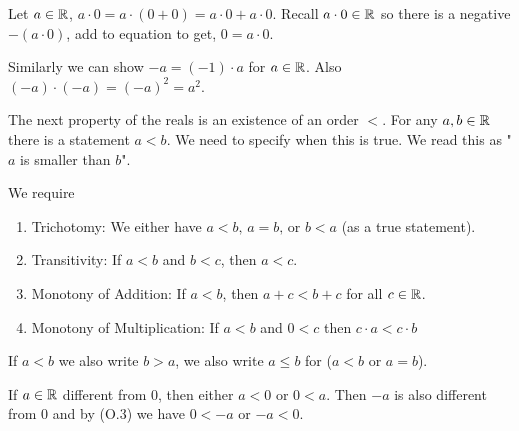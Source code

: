 \documentclass[10pt, a4paper]{article}
\begin{document}
Let $a \in \mathbb{R}$, $a \cdot 0 = a \cdot (0 + 0) = a \cdot 0 + a \cdot 0$. Recall $a \cdot 0 \in \mathbb{R}$ so there is a negative $-(a \cdot 0)$, add to equation to get, $0 = a \cdot 0$.

Similarly we can show $-a = (-1) \cdot a$ for $a \in \mathbb{R}$. Also $(-a) \cdot (-a) = (-a) ^ 2 = a ^ 2$.


The next property of the reals is an existence of an order $<$. For any $a, b \in \mathbb{R}$ there is a statement $a < b$. We need to specify when this is true. We read this as "$a$ is smaller than $b$".

We require
\begin{enumerate}[label = (O.\arabic*)]
    \item Trichotomy\label{analy_axiom_trichotomy}: We either have $a < b,\, a = b,\,\text{or } b < a$ (as a true statement).
    \item Transitivity: If $a < b$ and $b < c$, then $a < c$.
    \item Monotony of Addition: If $a < b$, then $a + c < b + c$ for all $c \in \mathbb{R}$.
    \item Monotony of Multiplication: If $a < b$ and $0 < c$ then $c \cdot a < c \cdot b$
\end{enumerate}
If $a < b$ we also write $b > a$, we also write $a \leq b$ for ($a < b$ or $a = b$).

If $a \in \mathbb{R}$ different from $0$, then either $a < 0$ or $0 < a$. Then $-a$ is also different from $0$ and by   (O.3) we have $0 < -a$ or $-a < 0$.
\end{document}
